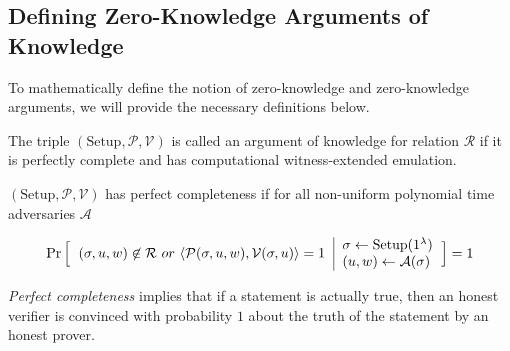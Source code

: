 \subsection{Defining Zero-Knowledge Arguments of Knowledge}
\label{subsec:zka/d_aok}
To mathematically define the notion of zero-knowledge and zero-knowledge arguments, we will provide the necessary definitions below.

\begin{defn}
        The triple $(\text{Setup}, \mathcal{P}, \mathcal{V})$ is called an argument of knowledge for relation $\mathcal{R}$ if it is perfectly complete and has computational witness-extended emulation.
\end{defn}

\begin{defn}
    $(\text{Setup}, \mathcal{P}, \mathcal{V})$ has perfect completeness if for all non-uniform polynomial time adversaries $\mathcal{A}$

    \begin{equation*}
    \Pr 
    \Big[
    \begin{tabular}{c | l}
         \multirow{2}{*}{$(\sigma, u, w) \not \in \mathcal{R} \ or \ 
         \langle \mathcal{P}(\sigma, u, w), \mathcal{V}(\sigma, u) \rangle = 1$}
         & $\sigma \leftarrow \text{Setup}(1^{\lambda})$
         \\
         & 
         $(u, w) \leftarrow \mathcal{A}(\sigma)$
    \end{tabular}
    \Big] 
    = 1
\end{equation*}
\end{defn}

\emph{Perfect completeness} implies that if a statement is actually true, then an honest verifier is convinced with probability $1$ about the truth of the statement by an honest prover.

